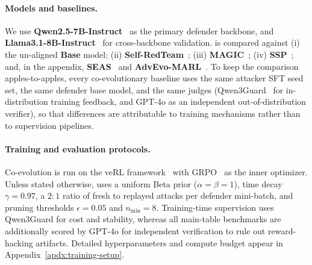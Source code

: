 \paragraph{Models and baselines.} We use \textbf{Qwen2.5-7B-Instruct}~\citep{yang2025qwen25} as the primary defender backbone, and \textbf{Llama3.1-8B-Instruct}~\citep{touvron2023llama} for cross-backbone validation. \method is compared against (i) the un-aligned \textbf{Base} model; (ii) \textbf{Self-RedTeam}~\citep{liu2025chasing}; (iii) \textbf{MAGIC}~\citep{magic2025}; (iv) \textbf{SSP}~\citep{ssp2026}; and, in the appendix, \textbf{SEAS}~\citep{seas2025} and \textbf{AdvEvo-MARL}~\citep{pan2025advevo}. To keep the comparison apples-to-apples, every co-evolutionary baseline uses the same attacker SFT seed set, the same defender base model, and the same judges (Qwen3Guard~\citep{zhao2025qwen3guard} for in-distribution training feedback, and GPT-4o as an independent out-of-distribution verifier), so that differences are attributable to training mechanisms rather than to supervision pipelines.

\paragraph{Training and evaluation protocols.} Co-evolution is run on the veRL framework~\citep{sheng2025verl} with GRPO~\citep{shao2024grpo} as the inner optimizer. Unless stated otherwise, \method uses a uniform Beta prior ($\alpha=\beta=1$), time decay $\gamma=0.97$, a $2\!:\!1$ ratio of fresh to replayed attacks per defender mini-batch, and pruning thresholds $\epsilon=0.05$ and $n_{\min}=8$. Training-time supervision uses Qwen3Guard for cost and stability, whereas all main-table benchmarks are additionally scored by GPT-4o for independent verification to rule out reward-hacking artifacts. Detailed hyperparameters and compute budget appear in Appendix~\ref{apdx:training-setup}.

